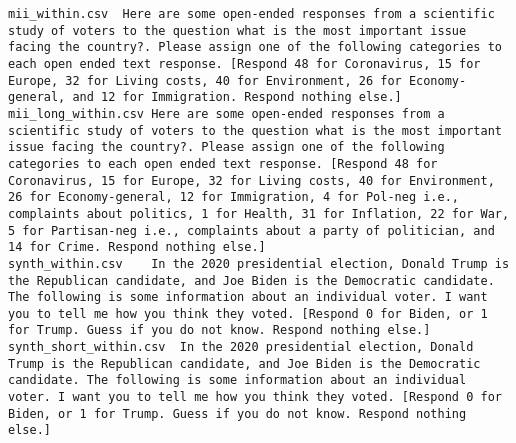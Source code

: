 \begin{lstlisting}
mii_within.csv	Here are some open-ended responses from a scientific study of voters to the question what is the most important issue facing the country?. Please assign one of the following categories to each open ended text response. [Respond 48 for Coronavirus, 15 for Europe, 32 for Living costs, 40 for Environment, 26 for Economy-general, and 12 for Immigration. Respond nothing else.]
mii_long_within.csv	Here are some open-ended responses from a scientific study of voters to the question what is the most important issue facing the country?. Please assign one of the following categories to each open ended text response. [Respond 48 for Coronavirus, 15 for Europe, 32 for Living costs, 40 for Environment, 26 for Economy-general, 12 for Immigration, 4 for Pol-neg i.e., complaints about politics, 1 for Health, 31 for Inflation, 22 for War, 5 for Partisan-neg i.e., complaints about a party of politician, and 14 for Crime. Respond nothing else.]
synth_within.csv	In the 2020 presidential election, Donald Trump is the Republican candidate, and Joe Biden is the Democratic candidate. The following is some information about an individual voter. I want you to tell me how you think they voted. [Respond 0 for Biden, or 1 for Trump. Guess if you do not know. Respond nothing else.]
synth_short_within.csv	In the 2020 presidential election, Donald Trump is the Republican candidate, and Joe Biden is the Democratic candidate. The following is some information about an individual voter. I want you to tell me how you think they voted. [Respond 0 for Biden, or 1 for Trump. Guess if you do not know. Respond nothing else.]
\end{lstlisting}